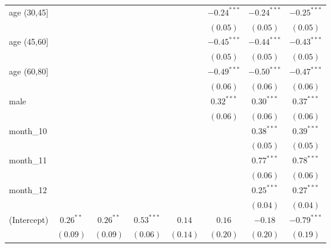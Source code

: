 \begin{table}[h!]
\begin{center}
\begin{tabular}{l c c c c c c c}
age (30,45]    &              &              &              &              & $-0.24^{***}$ & $-0.24^{***}$ & $-0.25^{***}$ \\
               &              &              &              &              & $(0.05)$      & $(0.05)$      & $(0.05)$      \\
age (45,60]    &              &              &              &              & $-0.45^{***}$ & $-0.44^{***}$ & $-0.43^{***}$ \\
               &              &              &              &              & $(0.05)$      & $(0.05)$      & $(0.05)$      \\
age (60,80]    &              &              &              &              & $-0.49^{***}$ & $-0.50^{***}$ & $-0.47^{***}$ \\
               &              &              &              &              & $(0.06)$      & $(0.06)$      & $(0.06)$      \\
male           &              &              &              &              & $0.32^{***}$  & $0.30^{***}$  & $0.37^{***}$  \\
               &              &              &              &              & $(0.06)$      & $(0.06)$      & $(0.06)$      \\
month\_10      &              &              &              &              &               & $0.38^{***}$  & $0.39^{***}$  \\
               &              &              &              &              &               & $(0.05)$      & $(0.05)$      \\
month\_11      &              &              &              &              &               & $0.77^{***}$  & $0.78^{***}$  \\
               &              &              &              &              &               & $(0.06)$      & $(0.06)$      \\
month\_12      &              &              &              &              &               & $0.25^{***}$  & $0.27^{***}$  \\
               &              &              &              &              &               & $(0.04)$      & $(0.04)$      \\
(Intercept)    & $0.26^{**}$  & $0.26^{**}$  & $0.53^{***}$ & $0.14$       & $0.16$        & $-0.18$       & $-0.79^{***}$ \\
               & $(0.09)$     & $(0.09)$     & $(0.06)$     & $(0.14)$     & $(0.20)$      & $(0.20)$      & $(0.19)$      \\

\end{tabular}
\end{center}
\end{table}
